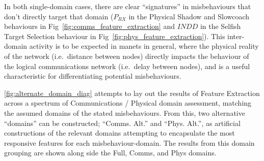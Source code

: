 In both single-domain cases, there are clear ``signatures'' in misbehaviours that don't directly target that domain ($P_{RX}$ in the Physical Shadow and Slowcoach behaviours in Fig~\ref{fig:comms_feature_extraction} and $INDD$ in the Selfish Target Selection behaviour in Fig~\ref{fig:phys_feature_extraction}).
This inter-domain activity is to be expected in \glspl{manet} in general, where the physical reality of the network (i.e.\ distance between nodes) directly impacts the behaviour of the logical communications network (i.e.\ delay between nodes), and is a useful characteristic for differentiating potential misbehaviours.

\autoref{fig:alternate_domain_diag} attempts to lay out the results of Feature Extraction across a spectrum of Communications / Physical domain assessment, matching the assumed domains of the stated misbehaviours.
From this, two alternative ``domains'' can be constructed; ``Comms. Alt.'' and ``Phys. Alt.'', as artificial constructions of the relevant domains attempting to encapsulate the most responsive features for each misbehaviour-domain.
The results from this domain grouping are shown along side the Full, Comms, and Phys domains.


